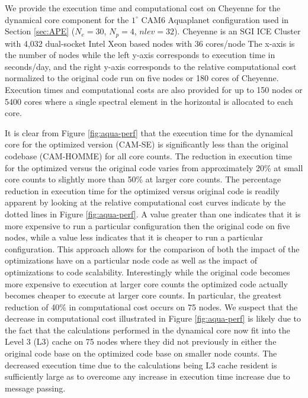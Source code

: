 \documentclass{agujournal}
\begin{document}
{We provide the execution time and computational cost on Cheyenne for the dynamical core component for the $1^\circ$ CAM6 Aquaplanet configuration used in Section \ref{sec:APE} ($N_e=30$, $N_p=4$, $nlev=32$). Cheyenne is an SGI ICE Cluster with 4,032 dual-socket Intel Xeon based nodes with 36 cores/node   The x-axis is the number of nodes while the left y-axis corresponds to execution time in seconds/day, and the right y-axis corresponds to the relative computational cost normalized to the original code run on five nodes or 180 cores of Cheyenne. Execution times and computational costs are also provided for up to 150 nodes or 5400 cores where a single spectral element in the horizontal is allocated to each core.

It is clear from Figure \ref{fig:aqua-perf} that the execution time for the dynamical core for the optimized version (CAM-SE) is significantly less than the original codebase (CAM-HOMME) for all core counts. The reduction in execution time for the optimized versus the original code varies from approximately 20\% at small core counts to slightly more than 50\% at larger core counts. The percentage reduction in execution time for the optimized versus original code is readily apparent by looking at the relative computational cost curves indicate by the dotted lines in Figure \ref{fig:aqua-perf}.  A value greater than one indicates that it is more expensive to run a particular configuration then the original code on five nodes, while a value less indicates that it is cheaper to run a particular configuration.  This approach allows for the comparison of both the impact of the optimizations have on a particular node code as well as the impact of optimizations to code scalability.  Interestingly while the original code becomes more expensive to execution at larger core counts the optimized code actually becomes cheaper to execute at larger core counts.  In particular, the greatest reduction of 40\% in computational cost occurs on 75 nodes.  We suspect that the decrease in computational cost illustrated in Figure \ref{fig:aqua-perf} is likely due to the fact that the calculations performed in the dynamical core now fit into the Level 3 (L3) cache on 75 nodes where they did not previously in either the original code base on the optimized code base on smaller node counts.  The decreased execution time due to the calculations being L3 cache resident is sufficiently large as to overcome any increase in execution time increase due to message passing.  

}
\end{document}
